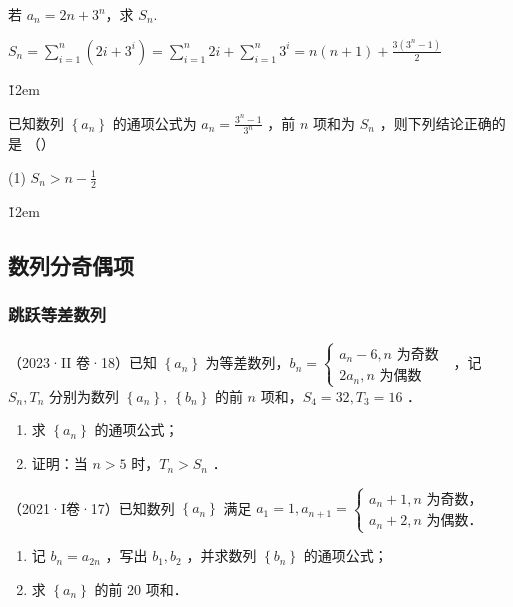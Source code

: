 \begin{example}
    若 $a_n = 2n + 3^n$，求 $S_n$.
\end{example}

\begin{solution}
    $S_n = \sum_{i=1}^n (2i + 3^i) = \sum_{i=1}^n 2i + \sum_{i=1}^n 3^i = n(n+1) + \frac{3(3^n-1)}{2}$
\end{solution}

\v{12em}

\begin{example}
    已知数列 $\left\{a_n\right\}$ 的通项公式为 $a_n=\frac{3^n-1}{3^n}$ ，前 $n$ 项和为 $S_n$ ，则下列结论正确的是 （\qquad）
    \begin{tasks}(1)
        \task $S_n>n-\frac{1}{2}$
    \end{tasks}
\end{example}

\v{12em}

\subsection{数列分奇偶项}

\subsubsection{跳跃等差数列}



\begin{example}
    （2023·II 卷·18）已知 $\left\{a_n\right\}$ 为等差数列，$b_n=\left\{\begin{array}{l}a_n-6, n \text { 为奇数 } \\ 2 a_n, n \text { 为偶数 }\end{array}\right.$ ，记 $S_n, T_n$ 分别为数列 $\left\{a_n\right\}, ~\left\{b_n\right\}$ 的前 $n$ 项和，$S_4=32, T_3=16$ ．
    \begin{enumerate}
        \item 求 $\left\{a_n\right\}$ 的通项公式；
        \item 证明：当 $n>5$ 时，$T_n>S_n$ ．
    \end{enumerate}
\end{example}

\vspace{10em}

\begin{example}
    （2021·I卷·17）已知数列 $\left\{a_n\right\}$ 满足 $a_1=1, a_{n+1}=\left\{\begin{array}{l}a_n+1, n \text { 为奇数，} \\ a_n+2, n \text { 为偶数．}\end{array}\right.$
    \begin{enumerate}
        \item 记 $b_n=a_{2 n}$ ，写出 $b_1, b_2$ ，并求数列 $\left\{b_n\right\}$ 的通项公式；
        \item 求 $\left\{a_n\right\}$ 的前 20 项和．
    \end{enumerate}
\end{example}

